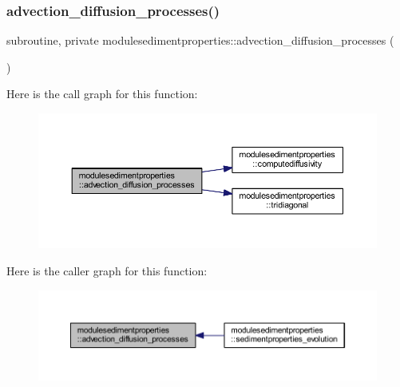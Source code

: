 \subsubsection{\texorpdfstring{advection\+\_\+diffusion\+\_\+processes()}{advection\_diffusion\_processes()}}
{\footnotesize\ttfamily subroutine, private modulesedimentproperties\+::advection\+\_\+diffusion\+\_\+processes (\begin{DoxyParamCaption}{ }\end{DoxyParamCaption})\hspace{0.3cm}{\ttfamily [private]}}

Here is the call graph for this function\+:\nopagebreak
\begin{figure}[H]
\begin{center}
\leavevmode
\includegraphics[width=350pt]{namespacemodulesedimentproperties_ad4e53e8aa65867e0dd71960c0df2dc06_cgraph}
\end{center}
\end{figure}
Here is the caller graph for this function\+:\nopagebreak
\begin{figure}[H]
\begin{center}
\leavevmode
\includegraphics[width=350pt]{namespacemodulesedimentproperties_ad4e53e8aa65867e0dd71960c0df2dc06_icgraph}
\end{center}
\end{figure}
\mbox{\label{namespacemodulesedimentproperties_a0e2131732a53a8682cb31baa3a65d6ae}} 

